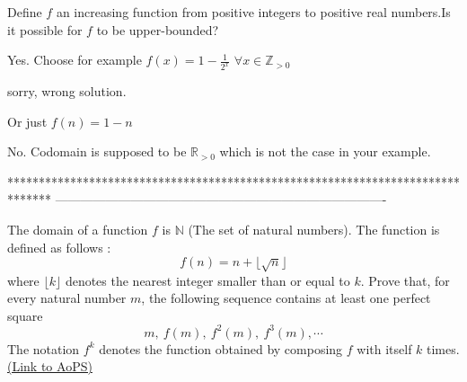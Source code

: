 


\begin{solution}
	\begin{tcolorbox}Define $f$ an increasing function from positive integers to positive real numbers.Is it possible for $f$ to be upper-bounded?\end{tcolorbox}
Yes.
Choose for example $f(x)=1-\frac 1{2^x}$ $\forall x\in\mathbb Z_{>0}$


\end{solution}



\begin{solution}
	sorry, wrong solution.
\end{solution}



\begin{solution}
	\begin{tcolorbox}Or just $f(n)=1-n$\end{tcolorbox}
No. Codomain is supposed to be $\mathbb R_{>0}$ which is not the case in your example.

\end{solution}
*******************************************************************************
-------------------------------------------------------------------------------

\begin{problem}
	The domain of a function $f$ is $\mathbb{N}$ (The set of natural numbers). The function is defined as follows : $$f(n)=n+\lfloor\sqrt{n}\rfloor$$ where $\lfloor k\rfloor$ denotes the nearest integer smaller than or equal to $k$. Prove that, for every natural number $m$, the following sequence contains at least one perfect square $$m,~f(m),~f^2(m),~f^3(m),\cdots$$ The notation $f^k$ denotes the function obtained by composing $f$ with itself $k$ times.
	\flushright \href{https://artofproblemsolving.com/community/c6h1633923}{(Link to AoPS)}
\end{problem}



